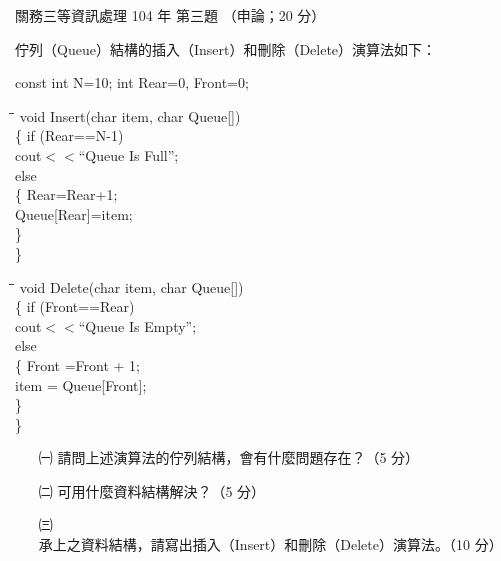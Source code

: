 \begin{pastexam}[label={px:gw3-104-ds-03}]{關務三等資訊處理 104 年 第三題}
（申論；20 分）

佇列（Queue）結構的插入（Insert）和刪除（Delete）演算法如下：

{\small
\noindent const int N=10; int Rear=0, Front=0;\\[2pt]
\begin{minipage}[t]{0.47\linewidth}
\begin{tabbing}
\hspace*{1.2em}\=\hspace*{1.5em}\=\hspace*{1.5em}\=\kill
void Insert(char item, char Queue[])\\
\{ \> if (Rear==N-1)\\
\>\> cout$<<$``Queue Is Full'';\\
\> else\\
\> \{ \> Rear=Rear+1;\\
\>\> Queue[Rear]=item;\\
\> \}\\
\}
\end{tabbing}
\end{minipage}\hfill
\begin{minipage}[t]{0.47\linewidth}
\begin{tabbing}
\hspace*{1.2em}\=\hspace*{1.5em}\=\hspace*{1.5em}\=\kill
void Delete(char item, char Queue[])\\
\{ \> if (Front==Rear)\\
\>\> cout$<<$``Queue Is Empty'';\\
\> else\\
\> \{ \> Front =Front + 1;\\
\>\> item = Queue[Front];\\
\> \}\\
\}
\end{tabbing}
\end{minipage}
}
\begin{itemize}[leftmargin=2.2em, nosep]
\item[㈠] 請問上述演算法的佇列結構，會有什麼問題存在？（5 分）
\item[㈡] 可用什麼資料結構解決？（5 分）
\item[㈢] 承上之資料結構，請寫出插入（Insert）和刪除（Delete）演算法。（10 分）
\end{itemize}
\end{pastexam}

